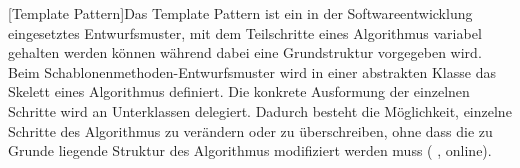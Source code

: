 \begin{acronym}
    [Template Pattern]{Das Template Pattern ist ein in der Softwareentwicklung eingesetztes Entwurfsmuster, mit dem Teilschritte eines Algorithmus variabel gehalten werden können während dabei eine Grundstruktur vorgegeben wird. Beim Schablonenmethoden-Entwurfsmuster wird in einer abstrakten Klasse das Skelett eines Algorithmus definiert. Die konkrete Ausformung der einzelnen Schritte wird an Unterklassen delegiert. Dadurch besteht die Möglichkeit, einzelne Schritte des Algorithmus zu verändern oder zu überschreiben, ohne dass die zu Grunde liegende Struktur des Algorithmus modifiziert werden muss (\citeauthor{wikipedia_schablonenmethode_2018} \citeyear{wikipedia_schablonenmethode_2018}, online).}
\end{acronym}

